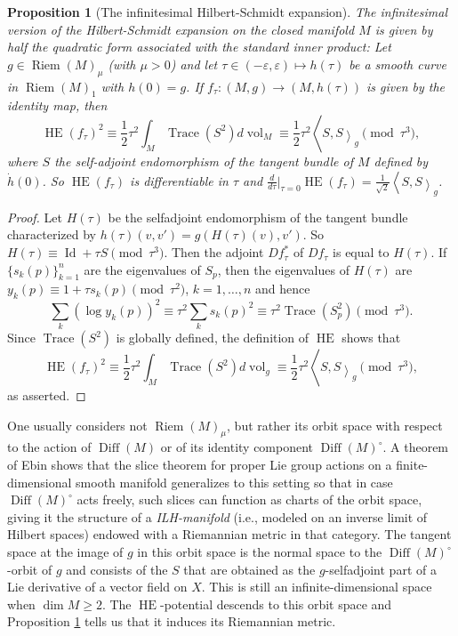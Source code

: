 \documentclass[11pt,letterpaper]{amsart}
\newtheorem{proposition}[theorem]{Proposition}
\theoremstyle{definition}
\numberwithin{equation}{section}
\theoremstyle{definition}
\DeclareMathOperator{\Id}{Id}
\DeclareMathOperator{\tr}{Trace}
\DeclareMathOperator{\Riem}{Riem}
\DeclareMathOperator{\la}{\langle}
\DeclareMathOperator{\ra}{\rangle}
\DeclareMathOperator{\Diff}{Diff}
\DeclareMathOperator{\HE}{HE}
\newcommand{\vol}{\operatorname{vol}}
\begin{document}
\begin{proposition}[The infinitesimal Hilbert-Schmidt expansion]\label{prop:WP}
The infinitesimal version of the Hilbert-Schmidt expansion on the closed manifold $M$ is given by half  the quadratic form associated with the standard inner product: Let  $g\in \Riem(M)_\mu$ (with $\mu>0$) and let $\tau\in(-\varepsilon, \varepsilon)\mapsto h(\tau)$ be a smooth curve in $\Riem(M)_1$ with 
$h(0)=g$.  If  $f_\tau: (M,g)\to (M, h(\tau))$ is  given by the identity map, then 
\[
\textstyle \HE(f_\tau)^2\equiv \frac{1}{2}\tau^2 \int_M\tr(S^2)d\!\vol_M\equiv \frac{1}{2}\tau^2\la S, S\ra_g \pmod{\tau^3},
\]
where $S$ the self-adjoint endomorphism of the tangent bundle of $M$ defined by $\dot h(0)$.
So $\HE(f_\tau)$ is differentiable in $\tau$ and   $\frac{d}{d\tau}\big|_{\tau=0}\HE(f_\tau)=\frac{1}{\sqrt 2}\la S, S\ra_g$.
\end{proposition}
\begin{proof}
Let $H(\tau)$ be the selfadjoint endomorphism of the tangent bundle characterized by $h(\tau)(v,v')=g(H(\tau)(v), v')$.
So $H(\tau)\equiv\Id+\tau S\pmod{\tau^3}$.
Then the adjoint  $Df_\tau^*$ of $Df_\tau$ is equal to $H(\tau)$. 
If  $\{s_k(p)\}_{k=1}^n$ are the eigenvalues of $S_p$, then the  eigenvalues of $H(\tau)$ are $y_k(p)\equiv 1+\tau s_k(p)\pmod{\tau^2}$, $k=1, \dots, n$ and hence 
\[
\textstyle \sum_k (\log y_k(p))^2\equiv \tau^2 \sum_k s_k(p)^2\equiv\tau^2 \tr(S_p^2)\pmod{\tau^3}.
\] 
Since $\tr(S^2)$ is globally defined, the definition of $\HE$  shows  that 
\[
\textstyle \HE(f_\tau)^2\equiv\frac{1}{2}\tau^2 \int_M \tr(S^2)d\!\vol_g\equiv \frac{1}{2}\tau^2\la S, S\ra_g\pmod{\tau^3},
\] 
as asserted.
\end{proof}



One usually considers not $\Riem (M)_\mu$, but rather its orbit space with respect to the action of 
$\Diff(M)$ or of its identity component $\Diff(M)^\circ$.   A theorem of Ebin \cite{Ebin68} shows that the slice theorem 
for proper Lie group  actions on a finite-dimensional smooth manifold  generalizes to this setting so that in case 
$\Diff(M)^\circ$ acts freely, such slices can function as charts of the orbit space, 
giving it the structure of a \emph{ILH-manifold} (i.e., modeled on an inverse limit of Hilbert spaces) endowed with a  Riemannian metric in that category. The tangent space at the image of $g$ in this orbit space is the normal space to the $\Diff(M)^\circ$-orbit of $g$ and  consists of the  $S$ that are obtained as  the $g$-selfadjoint part of a Lie derivative  of a vector field on $X$.  This is still an infinite-dimensional space when $\dim M\ge 2$. The $\HE$-potential descends to this orbit space and Proposition \ref{prop:WP}  tells us that it induces its Riemannian metric.
\end{document}
